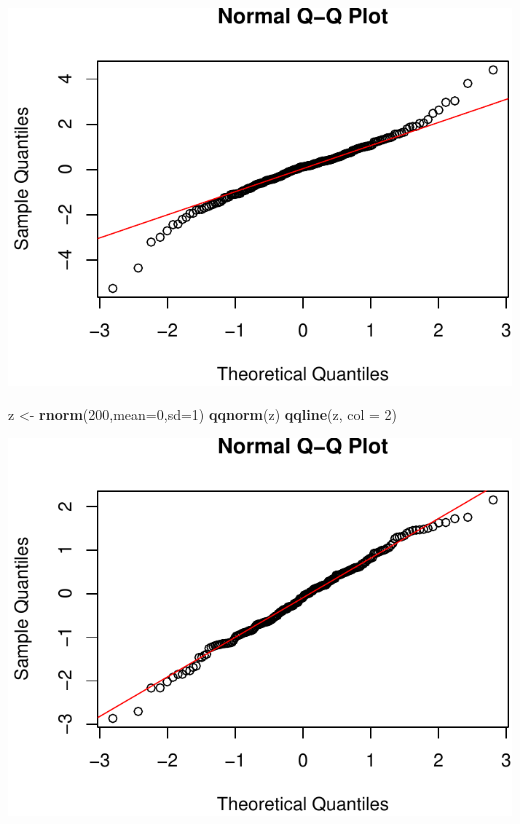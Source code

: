 \documentclass[]{article}
\newenvironment{Shaded}{\begin{snugshade}}{\end{snugshade}}
\newcommand{\KeywordTok}[1]{\textcolor[rgb]{0.13,0.29,0.53}{\textbf{{#1}}}}
\newcommand{\DataTypeTok}[1]{\textcolor[rgb]{0.13,0.29,0.53}{{#1}}}
\newcommand{\DecValTok}[1]{\textcolor[rgb]{0.00,0.00,0.81}{{#1}}}
\newcommand{\StringTok}[1]{\textcolor[rgb]{0.31,0.60,0.02}{{#1}}}
\newcommand{\NormalTok}[1]{{#1}}
\numberwithin{equation}{section}
\begin{document}
\includegraphics{index_files/figure-latex/unnamed-chunk-87-1.pdf}

\begin{Shaded}
\begin{Highlighting}[]
\NormalTok{z <-}\StringTok{ }\KeywordTok{rnorm}\NormalTok{(}\DecValTok{200}\NormalTok{,}\DataTypeTok{mean=}\DecValTok{0}\NormalTok{,}\DataTypeTok{sd=}\DecValTok{1}\NormalTok{)}
\KeywordTok{qqnorm}\NormalTok{(z)}
\KeywordTok{qqline}\NormalTok{(z, }\DataTypeTok{col =} \DecValTok{2}\NormalTok{)}
\end{Highlighting}
\end{Shaded}

\includegraphics{index_files/figure-latex/unnamed-chunk-87-2.pdf}
\end{document}
